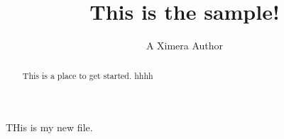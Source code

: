 \documentclass[handout]{ximera}
\title{This is the sample!}
\author{A Ximera Author}
\begin{document}
\begin{abstract}
  This is a place to get started. hhhh
\end{abstract}


\maketitle

THis is my new file.
\end{document}
